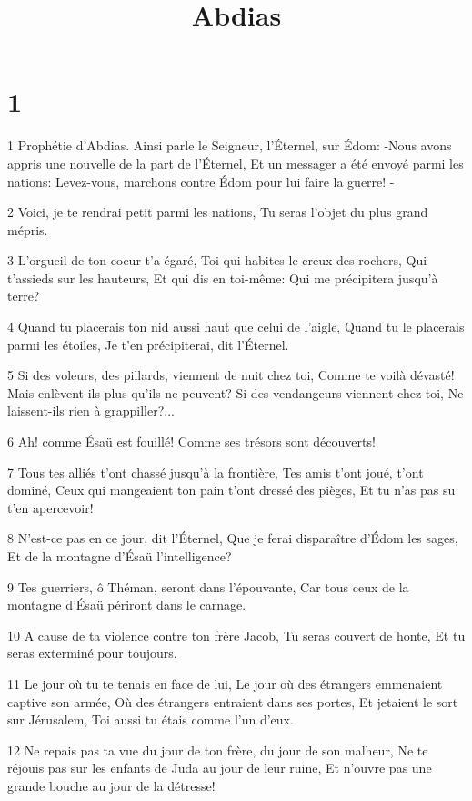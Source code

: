 

\title{Abdias}


\chapter{1}

\par 1 Prophétie d'Abdias. Ainsi parle le Seigneur, l'Éternel, sur Édom: -Nous avons appris une nouvelle de la part de l'Éternel, Et un messager a été envoyé parmi les nations: Levez-vous, marchons contre Édom pour lui faire la guerre! -
\par 2 Voici, je te rendrai petit parmi les nations, Tu seras l'objet du plus grand mépris.
\par 3 L'orgueil de ton coeur t'a égaré, Toi qui habites le creux des rochers, Qui t'assieds sur les hauteurs, Et qui dis en toi-même: Qui me précipitera jusqu'à terre?
\par 4 Quand tu placerais ton nid aussi haut que celui de l'aigle, Quand tu le placerais parmi les étoiles, Je t'en précipiterai, dit l'Éternel.
\par 5 Si des voleurs, des pillards, viennent de nuit chez toi, Comme te voilà dévasté! Mais enlèvent-ils plus qu'ils ne peuvent? Si des vendangeurs viennent chez toi, Ne laissent-ils rien à grappiller?...
\par 6 Ah! comme Ésaü est fouillé! Comme ses trésors sont découverts!
\par 7 Tous tes alliés t'ont chassé jusqu'à la frontière, Tes amis t'ont joué, t'ont dominé, Ceux qui mangeaient ton pain t'ont dressé des pièges, Et tu n'as pas su t'en apercevoir!
\par 8 N'est-ce pas en ce jour, dit l'Éternel, Que je ferai disparaître d'Édom les sages, Et de la montagne d'Ésaü l'intelligence?
\par 9 Tes guerriers, ô Théman, seront dans l'épouvante, Car tous ceux de la montagne d'Ésaü périront dans le carnage.
\par 10 A cause de ta violence contre ton frère Jacob, Tu seras couvert de honte, Et tu seras exterminé pour toujours.
\par 11 Le jour où tu te tenais en face de lui, Le jour où des étrangers emmenaient captive son armée, Où des étrangers entraient dans ses portes, Et jetaient le sort sur Jérusalem, Toi aussi tu étais comme l'un d'eux.
\par 12 Ne repais pas ta vue du jour de ton frère, du jour de son malheur, Ne te réjouis pas sur les enfants de Juda au jour de leur ruine, Et n'ouvre pas une grande bouche au jour de la détresse!

